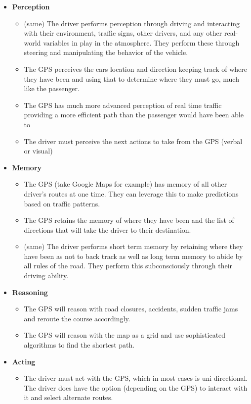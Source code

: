 \begin{itemize}
\item
  \textbf{Perception}
  \begin{itemize}
  \item
    (same) The driver performs perception through driving and interacting with their environment, traffic signs, other drivers, and any other real-world variables in play in the atmosphere. They perform these through steering and manipulating the behavior of the vehicle.
  \item
    The GPS perceives the cars location and direction keeping track of where they have been and using that to determine where they must go, much like the passenger.
  \item
    The GPS has much more advanced perception of real time traffic providing a more efficient path than the passenger would have been able to
  \item
    The driver must perceive the next actions to take from the GPS (verbal or visual)
  \end{itemize}
\item
  \textbf{Memory}
  \begin{itemize}
  \item
    The GPS (take Google Maps for example) has memory of all other driver's routes at one time. They can leverage this to make predictions based on  traffic patterns.
  \item
    The GPS retains the memory of where they have been and the list of directions that will take the driver to their destination.
  \item
    (same) The driver performs short term memory by retaining where they have been as not to back track as well as long term memory to abide by all rules of the road. They perform this subconsciously through their driving ability.
  \end{itemize}
\item
  \textbf{Reasoning}
  \begin{itemize}
  \item
    The GPS will reason with road closures, accidents, sudden traffic jams and reroute the course accordingly.
  \item
    The GPS will reason with the map as a grid and use sophisticated algorithms to find the shortest path.
  \end{itemize}
\item
  \textbf{Acting}
  \begin{itemize}
  \item
    The driver must act with the GPS, which in most cases is uni-directional. The driver does have the option (depending on the GPS) to interact with it and select alternate routes.
  \end{itemize}
\end{itemize}

